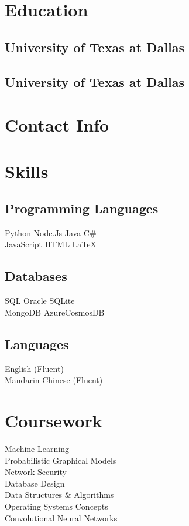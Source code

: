 \documentclass{fortythree_resume}
\begin{document}
\sectionsep

\begin{minipage}[t]{0.33\textwidth}

\section{Education}
\subsection{University of Texas at Dallas}
\subsection{University of Texas at Dallas}
\sectionsep

\section{Contact Info}
\sectionsep

\section{Skills}
\subsection{Programming Languages}
Python \textbullet{} Node.Js \textbullet{} Java \textbullet{} C\# \\
JavaScript \textbullet{} HTML \textbullet{} \LaTeX
\subsection{Databases}
SQL \textbullet{} Oracle \textbullet{} SQLite\\ 
MongoDB \textbullet{} AzureCosmosDB
\subsection{Languages}
English \hfill(Fluent)\\
Mandarin Chinese \hfill(Fluent)\\
\sectionsep

\section{Coursework}
Machine Learning\\
Probabilistic Graphical Models\\
Network Security\\
Database Design\\
Data Structures \& Algorithms\\
Operating Systems Concepts\\
Convolutional Neural Networks

\end{minipage}
\end{document}
